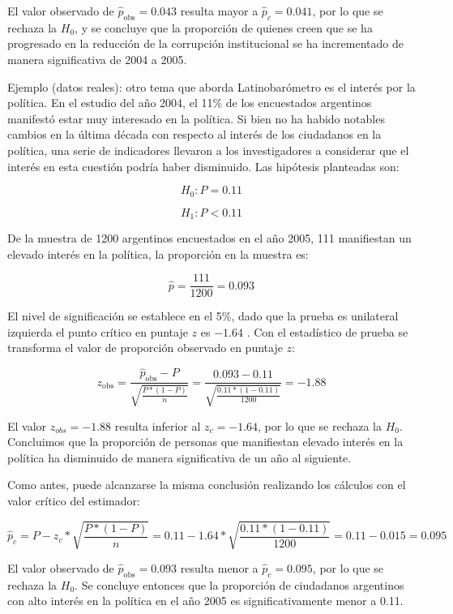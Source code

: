 \documentclass[]{book}
\begin{document}
El valor observado de \({\widehat{p}}_{\text{obs}} = 0.043\) resulta mayor
a \({\widehat{p}}_{c} = 0.041\), por lo que se rechaza la \(H_{0}\), y se
concluye que la proporción de quienes creen que se ha progresado en la
reducción de la corrupción institucional se ha incrementado de manera
significativa de 2004 a 2005.

Ejemplo (datos reales): otro tema que aborda Latinobarómetro es el
interés por la política. En el estudio del año 2004, el 11\% de los
encuestados argentinos manifestó estar muy interesado en la política. Si
bien no ha habido notables cambios en la última década con respecto al
interés de los ciudadanos en la política, una serie de indicadores
llevaron a los investigadores a considerar que el interés en esta
cuestión podría haber disminuido. Las hipótesis planteadas son:

\[H_{0}:P = 0.11\]

\[H_{1}:P < 0.11\]

De la muestra de 1200 argentinos encuestados en el año 2005, 111
manifiestan un elevado interés en la política, la proporción en la
muestra es:

\[\widehat{p} = \frac{111}{1200} = 0.093\]

El nivel de significación se establece en el 5\%, dado que la prueba es
unilateral izquierda el punto crítico en puntaje \(z\) es \(-1.64\) . Con el
estadístico de prueba se transforma el valor de proporción observado en
puntaje \(z\):

\[z_{\text{obs}} = \frac{{\widehat{p}}_{\text{obs}} - P}{\sqrt{\frac{P*(1 - P)}{n}}} = \frac{0.093 - 0.11}{\sqrt{\frac{0.11*(1 - 0.11)}{1200}}} = - 1.88\]

El valor \(z_{obs}=-1.88\) resulta inferior al \(z_{c}=-1.64\), por lo que
se rechaza la \(H_{0}\). Concluimos que la proporción de personas que
manifiestan elevado interés en la política ha disminuido de manera
significativa de un año al siguiente.

Como antes, puede alcanzarse la misma conclusión realizando los cálculos
con el valor crítico del estimador:

\[{\widehat{p}}_{c} = P - z_{c}*\sqrt{\frac{P*(1 - P)}{n}} = 0.11 - 1.64*\sqrt{\frac{0.11*(1 - 0.11)}{1200}} = 0.11 - 0.015 = 0.095\]

El valor observado de \({\widehat{p}}_{\text{obs}} = 0.093\) resulta menor
a \({\widehat{p}}_{c} = 0.095\), por lo que se rechaza la \(H_{0}\). Se
concluye entonces que la proporción de ciudadanos argentinos con alto
interés en la política en el año 2005 es significativamente menor a
0.11.
\end{document}
